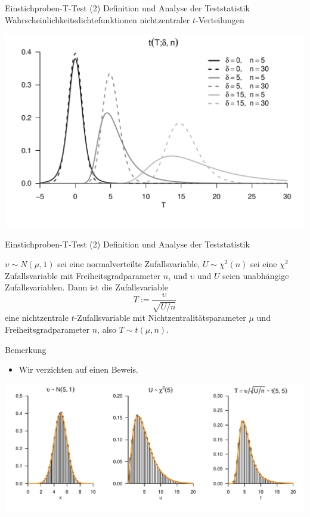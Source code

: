 \documentclass[
  8pt,
  ignorenonframetext,
]{beamer}
\providecommand{\tightlist}{%
  \setlength{\itemsep}{0pt}\setlength{\parskip}{0pt}}
\newcommand{\ups} {\upsilon}
\begin{document}
\begin{frame}{Einstichproben-T-Test \textbar{} (2) Definition und
Analyse der Teststatistik}
\protect\hypertarget{einstichproben-t-test-2-definition-und-analyse-der-teststatistik-2}{}
Wahrscheinlichkeitsdichtefunktionen nichtzentraler \(t\)-Verteilungen

\begin{center}\includegraphics[width=0.8\linewidth]{12_Abbildungen/wtfi_12_nichtzentrale_t_verteilung} \end{center}
\end{frame}

\begin{frame}{Einstichproben-T-Test \textbar{} (2) Definition und
Analyse der Teststatistik}
\protect\hypertarget{einstichproben-t-test-2-definition-und-analyse-der-teststatistik-3}{}
\footnotesize
\begin{theorem}
\normalfont
\justifying
$\ups \sim N(\mu,1)$ sei eine normalverteilte Zufallsvariable, $U \sim \chi^2(n)$
sei eine $\chi^2$ Zufallsvariable mit Freiheitsgradparameter $n$, und $\ups$ und
$U$ seien unabhängige Zufallsvariablen. Dann ist die Zufallsvariable
\begin{equation}
T := \frac{\ups}{\sqrt{U/n}}
\end{equation}
eine nichtzentrale $t$-Zufallsvariable mit Nichtzentralitätsparameter $\mu$ und
Freiheitsgradparameter $n$, also $T \sim t(\mu,n)$.
\end{theorem}
\vspace{-2mm}

Bemerkung

\begin{itemize}
\tightlist
\item
  Wir verzichten auf einen Beweis.
\end{itemize}

\begin{center}\includegraphics[width=0.8\linewidth]{12_Abbildungen/wtfi_12_nichtzentrale_t_transformation} \end{center}
\end{frame}
\end{document}

